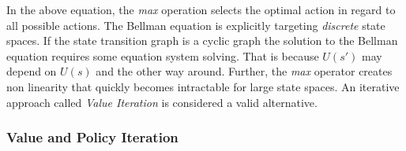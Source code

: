 \noindent In the above equation, the \emph{max} operation selects the optimal action in regard to all possible actions. The
Bellman equation is explicitly targeting \emph{discrete} state spaces. If the state transition graph is a cyclic graph
the solution to the Bellman equation requires some equation system solving. That is because $U(s')$ may depend on $U(s)$
and the other way around. Further, the \emph{max} operator creates non linearity that quickly becomes intractable for
large state spaces. An iterative approach called \emph{Value Iteration} is considered a valid alternative.







\subsubsection{Value and Policy Iteration}%
\label{sub:policy_and_value_iteration}

